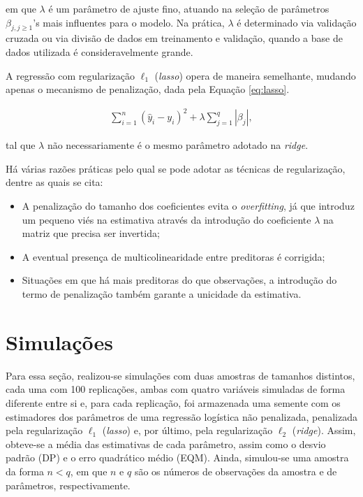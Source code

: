 \documentclass[
  12pt,
]{article}
\begin{document}
em que \(\lambda\) é um parâmetro de ajuste fino, atuando na seleção de
parâmetros \(\beta_{j, j \geq 1}\)'s mais influentes para o modelo. Na
prática, \(\lambda\) é determinado via validação cruzada ou via divisão
de dados em treinamento e validação, quando a base de dados utilizada é
consideravelmente grande.

\quad A regressão com regularização \(\ell_1\) (\emph{lasso}) opera de
maneira semelhante, mudando apenas o mecanismo de penalização, dada pela
Equação \ref{eq:lasso}.

\begin{eqnarray}
\label{eq:lasso}
\sum_{i=1}^{n}(\hat{y}_i - y_i)^2 + \lambda \sum_{j=1}^{q}|\beta_j|,
\end{eqnarray}

tal que \(\lambda\) não necessariamente é o mesmo parâmetro adotado na
\emph{ridge}.

\quad Há várias razões práticas pelo qual se pode adotar as técnicas de
regularização, dentre as quais se cita:

\begin{itemize}
\item A penalização do tamanho dos coeficientes evita o \textit{overfitting}, já que introduz um pequeno viés na estimativa através da introdução do coeficiente $\lambda$ na matriz que precisa ser invertida;
\item A eventual presença de multicolinearidade entre preditoras é corrigida;
\item Situações em que há mais preditoras do que observações, a introdução do termo de penalização também garante a unicidade da estimativa.
\end{itemize}

\section{Simulações}

\quad Para essa seção, realizou-se simulações com duas amostras de
tamanhos distintos, cada uma com 100 replicações, ambas com quatro
variáveis simuladas de forma diferente entre si e, para cada replicação,
foi armazenada uma semente com os estimadores dos parâmetros de uma
regressão logística não penalizada, penalizada pela regularização
\(\ell_1\) (\emph{lasso}) e, por último, pela regularização \(\ell_2\)
(\emph{ridge}). Assim, obteve-se a média das estimativas de cada
parâmetro, assim como o desvio padrão (DP) e o erro quadrático médio
(EQM). Ainda, simulou-se uma amostra da forma \(n < q\), em que \(n\) e
\(q\) são os números de observações da amostra e de parâmetros,
respectivamente.
\end{document}
